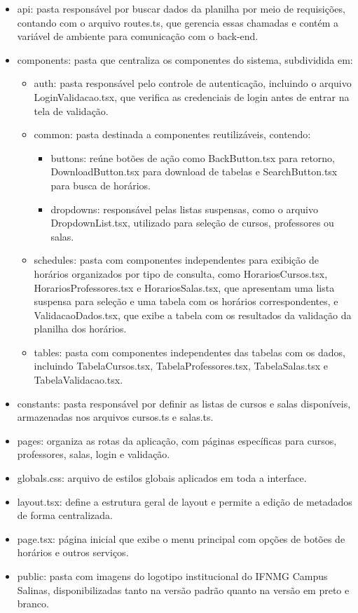 \begin{itemize}
    \item api: pasta responsável por buscar dados da planilha por meio de requisições, contando com o arquivo routes.ts, que gerencia essas chamadas e contém a variável de ambiente para comunicação com o back-end.
    \item components: pasta que centraliza os componentes do sistema, subdividida em:
    \begin{itemize}
        \item auth: pasta responsável pelo controle de autenticação, incluindo o arquivo LoginValidacao.tsx, que verifica as credenciais de login antes de entrar na tela de validação.
        \item common: pasta destinada a componentes reutilizáveis, contendo:
        \begin{itemize}
            \item buttons: reúne botões de ação como BackButton.tsx para retorno, DownloadButton.tsx para download de tabelas e SearchButton.tsx para busca de horários.
             \item dropdowns: responsável pelas listas suspensas, como o arquivo DropdownList.tsx, utilizado para seleção de cursos, professores ou salas.
        \end{itemize}
        \item schedules: pasta com componentes independentes para exibição de horários organizados por tipo de consulta, como HorariosCursos.tsx, HorariosProfessores.tsx e HorariosSalas.tsx, que apresentam uma lista suspensa para seleção e uma tabela com os horários correspondentes, e ValidacaoDados.tsx, que exibe a tabela com os resultados da validação da planilha dos horários.
        \item tables: pasta com componentes independentes das tabelas com os dados, incluindo TabelaCursos.tsx, TabelaProfessores.tsx, TabelaSalas.tsx e TabelaValidacao.tsx.
    \end{itemize}
    \item constants: pasta responsável por definir as listas de cursos e salas disponíveis, armazenadas nos arquivos cursos.ts e salas.ts.
    \item pages: organiza as rotas da aplicação, com páginas específicas para cursos, professores, salas, login e validação.
    \item globals.css: arquivo de estilos globais aplicados em toda a interface.
    \item layout.tsx: define a estrutura geral de layout e permite a edição de metadados de forma centralizada.
    \item page.tsx: página inicial que exibe o menu principal com opções de botões de horários e outros serviços.
    \item public: pasta com imagens do logotipo institucional do IFNMG Campus Salinas, disponibilizadas tanto na versão padrão quanto na versão em preto e branco.
\end{itemize}

